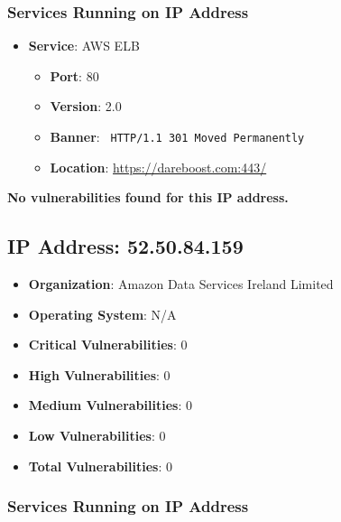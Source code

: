 \documentclass{article}
\begin{document}
\subsubsection*{Services Running on IP Address}

\begin{itemize}
    
        \item \textbf{Service}: AWS ELB
        \begin{itemize}
            \item \textbf{Port}: 80
            \item \textbf{Version}:  2.0 
            \item \textbf{Banner}: \texttt{ HTTP/1.1 301 Moved Permanently
 }
            \item \textbf{Location}: \href{ https://dareboost.com:443/ }{ https://dareboost.com:443/ }
        \end{itemize}
    
\end{itemize}


\textbf{No vulnerabilities found for this IP address.}


\clearpage



\subsection*{IP Address: 52.50.84.159}

\begin{itemize}
    \item \textbf{Organization}: Amazon Data Services Ireland Limited
    \item \textbf{Operating System}:  N/A 
    \item \textbf{Critical Vulnerabilities}: 0
    \item \textbf{High Vulnerabilities}: 0
    \item \textbf{Medium Vulnerabilities}: 0
    \item \textbf{Low Vulnerabilities}: 0
    \item \textbf{Total Vulnerabilities}: 0
\end{itemize}

\subsubsection*{Services Running on IP Address}
\end{document}
